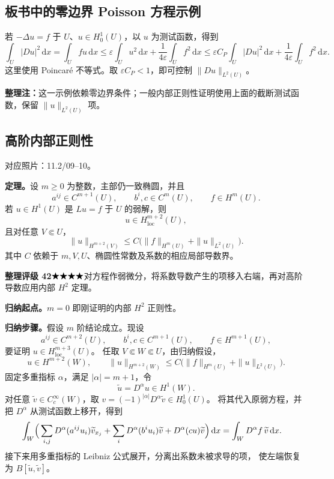 \documentclass[UTF8,a4paper,11pt,fontset=fandol]{ctexart}
\newcommand{\dd}{\,\mathrm d}
\newcommand{\ednote}[1]{\par{\small\color{notegray}\textbf{整理注：}#1}\par}
\newcommand{\source}[1]{{\small\color{notegray}对应照片：#1。}\par}
\newcommand{\proofstars}[1]{\ensuremath{%
\ifnum#1>0\relax\bigstar\fi
\ifnum#1>1\relax\bigstar\fi
\ifnum#1>2\relax\bigstar\fi
\ifnum#1>3\relax\bigstar\fi
\ifnum#1>4\relax\bigstar\fi}}
\newcommand{\proofrating}[3]{\par{\small\color{proofblue}%
\textbf{整理评级 #1}\enspace\proofstars{#2}\quad #3\par}}
\begin{document}
\subsection*{板书中的零边界 Poisson 方程示例}
若 $-\Delta u=f$ 于 $U$、$u\in H_0^1(U)$，以 $u$ 为测试函数，得到
\[
\int_U|Du|^2\dd x=\int_U fu\dd x
\leq\varepsilon\int_Uu^2\dd x+\frac1{4\varepsilon}\int_Uf^2\dd x
\leq\varepsilon C_P\int_U|Du|^2\dd x
 +\frac1{4\varepsilon}\int_Uf^2\dd x.
\]
这里使用 Poincar\'e 不等式。取 $\varepsilon C_P<1$，即可控制 $\|Du\|_{L^2(U)}$。
\ednote{这一示例依赖零边界条件；一般内部正则性证明使用上面的截断测试函数，保留 $\|u\|_{L^2(U)}$ 项。}

\newpage
\subsection{高阶内部正则性}
\source{11.2/09--10}
\textbf{定理。}设 $m\geq0$ 为整数，主部仍一致椭圆，并且
\[
a^{ij}\in C^{m+1}(U),\qquad b^i,c\in C^m(U),\qquad f\in H^m(U).
\]
若 $u\in H^1(U)$ 是 $Lu=f$ 于 $U$ 的弱解，则
\[
u\in H_{\mathrm{loc}}^{m+2}(U),
\]
且对任意 $V\Subset U$，
\[
\boxed{\|u\|_{H^{m+2}(V)}
\leq C\bigl(\|f\|_{H^m(U)}+\|u\|_{L^2(U)}\bigr).}
\]
其中 $C$ 依赖于 $m,V,U$、椭圆性常数及系数的相应局部导数界。

\proofrating{42}{4}{对方程作弱微分，将系数导数产生的项移入右端，再对高阶导数应用内部 $H^2$ 定理。}
\textbf{归纳起点。}$m=0$ 即刚证明的内部 $H^2$ 正则性。

\textbf{归纳步骤。}假设 $m$ 阶结论成立。现设
\[
a^{ij}\in C^{m+2}(U),\qquad b^i,c\in C^{m+1}(U),\qquad f\in H^{m+1}(U),
\]
要证明 $u\in H_{\mathrm{loc}}^{m+3}(U)$。
任取 $V\Subset W\Subset U$，由归纳假设，
\[
u\in H^{m+2}(W),\qquad
\|u\|_{H^{m+2}(W)}
\leq C\bigl(\|f\|_{H^m(U)}+\|u\|_{L^2(U)}\bigr).
\]
固定多重指标 $\alpha$，满足 $|\alpha|=m+1$，令
\[
\widetilde u=D^\alpha u\in H^1(W).
\]
对任意 $\widetilde v\in C_c^\infty(W)$，取
$v=(-1)^{|\alpha|}D^\alpha\widetilde v\in H_0^1(U)$。
将其代入原弱方程，并把 $D^\alpha$ 从测试函数上移开，得到
\[
\begin{aligned}
\int_W\Bigl(&\sum_{i,j}D^\alpha(a^{ij}u_i)\widetilde v_{x_j}
 +\sum_iD^\alpha(b^iu_i)\widetilde v
 +D^\alpha(cu)\widetilde v\Bigr)\dd x
=\int_W D^\alpha f\,\widetilde v\dd x.
\end{aligned}
\]
接下来用多重指标的 Leibniz 公式展开，分离出系数未被求导的项，
使左端恢复为 $B[\widetilde u,\widetilde v]$。

\newpage
\end{document}
